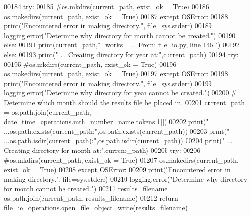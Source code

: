 \begin{DoxyCode}
00184                 \textcolor{keywordflow}{try}:
00185                     \textcolor{comment}{#os.mkdirs(current\_path, exist\_ok = True)}
00186                     os.makedirs(current\_path, exist\_ok = \textcolor{keyword}{True})
00187                 \textcolor{keywordflow}{except} OSError:
00188                     print(\textcolor{stringliteral}{"Encountered error in making directory."}, file=sys.stderr)
00189                     logging.error(\textcolor{stringliteral}{"Determine why directory for month cannot be created."})
00190             \textcolor{keywordflow}{else}:
00191                 print(current\_path,\textcolor{stringliteral}{"=works= ... From: file\_io.py, line 146."})
00192         \textcolor{keywordflow}{else}:
00193             print(\textcolor{stringliteral}{" ... Creating directory for year at:"},current\_path)
00194             \textcolor{keywordflow}{try}:
00195                 \textcolor{comment}{#os.mkdirs(current\_path, exist\_ok = True)}
00196                 os.makedirs(current\_path, exist\_ok = \textcolor{keyword}{True})
00197             \textcolor{keywordflow}{except} OSError:
00198                 print(\textcolor{stringliteral}{"Encountered error in making directory."}, file=sys.stderr)
00199                 logging.error(\textcolor{stringliteral}{"Determine why directory for year cannot be created."})
00200             \textcolor{comment}{# Determine which month should the results file be placed in.}
00201             current\_path = os.path.join(current\_path, date\_time\_operations.mth\_number\_name[tokens[1]])
00202             print(\textcolor{stringliteral}{" ...os.path.exists(current\_path:"},os.path.exists(current\_path))
00203             print(\textcolor{stringliteral}{" ...os.path.isdir(current\_path):"},os.path.isdir(current\_path))
00204             print(\textcolor{stringliteral}{" ... Creating directory for month at:"},current\_path)
00205             \textcolor{keywordflow}{try}:
00206                 \textcolor{comment}{#os.mkdirs(current\_path, exist\_ok = True)}
00207                 os.makedirs(current\_path, exist\_ok = \textcolor{keyword}{True})
00208             \textcolor{keywordflow}{except} OSError:
00209                 print(\textcolor{stringliteral}{"Encountered error in making directory."}, file=sys.stderr)
00210                 logging.error(\textcolor{stringliteral}{"Determine why directory for month cannot be created."})
00211         results\_filename = os.path.join(current\_path, results\_filename)
00212         \textcolor{keywordflow}{return} file\_io\_operations.open\_file\_object\_write(results\_filename)
\end{DoxyCode}
\hypertarget{classutilities_1_1file__io_1_1file__io__operations_a992b70cc7eeaafbe03fe5deb6a9f95d5}{}
